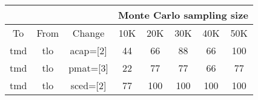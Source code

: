 \begin{center}
\begin{tabular}{|c|c|c|c|c|c|c|c|}\cline{4-8}
\multicolumn{3}{c|}{}&
\multicolumn{5}{c|}{Monte Carlo sampling size}
\\\hline 
To & From & Change & 10K & 20K & 30K & 40K & 50K
\\\hline\hline
tmd
& tlo
& acap=[2]
& 44
& 66
& 88
& 66
& 100
\\\hline
tmd
& tlo
& pmat=[3]
& 22
& 77
& 77
& 66
& 77
\\\hline
tmd
& tlo
& sced=[2]
& 77
& 100
& 100
& 100
& 100
\\\hline
\end{tabular}\end{center}
